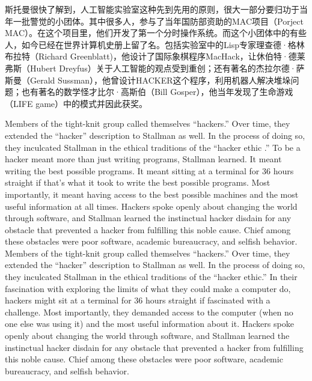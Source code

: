 \ifdefined\chs
斯托曼很快了解到，人工智能实验室这种先到先用的原则，很大一部分要归功于当年一批警觉的小团体。其中很多人，参与了当年国防部资助的MAC项目（Porject MAC）。在这个项目里，他们开发了第一个分时操作系统。而这个小团体中的有些人，如今已经在世界计算机史册上留了名。包括实验室中的Lisp专家理查德·格林布拉特（Richard Greenblatt)，他设计了国际象棋程序MacHack，让休伯特·德莱弗斯（Hubert Dreyfus）关于人工智能的观点受到重创；还有著名的杰拉尔德·萨斯曼（Gerald Sussman），他曾设计HACKER这个程序，利用机器人解决堆垛问题；也有著名的数学怪才比尔·高斯伯（Bill Gosper），他当年发现了生命游戏（LIFE game）中的模式并因此获奖。
\fi

\ifdefined\eng
\ifdefined\vone
Members of the tight-knit group called themselves ``hackers.'' Over time, they extended the ``hacker'' description to Stallman as well. In the process of doing so, they inculcated Stallman in the ethical traditions of the ``hacker ethic .'' To be a hacker meant more than just writing programs, Stallman learned. It meant writing the best possible programs. It meant sitting at a terminal for 36 hours straight if that's what it took to write the best possible programs. Most importantly, it meant having access to the best possible machines and the most useful information at all times. Hackers spoke openly about changing the world through software, and Stallman learned the instinctual hacker disdain for any obstacle that prevented a hacker from fulfilling this noble cause. Chief among these obstacles were poor software, academic bureaucracy, and selfish behavior.
\fi
\ifdefined\vtwo
Members of the tight-knit group called themselves ``hackers.'' Over time, they extended the ``hacker'' description to Stallman as well. In the process of doing so, they inculcated Stallman in the ethical traditions of the ``hacker ethic.'' In their fascination with exploring the limits of what they could make a computer do, hackers might sit at a terminal for 36 hours straight if fascinated with a challenge. Most importantly, they demanded access to the computer (when no one else was using it) and the most useful information about it. Hackers spoke openly about changing the world through software, and Stallman learned the instinctual hacker disdain for any obstacle that prevented a hacker from fulfilling this noble cause. Chief among these obstacles were poor software, academic bureaucracy, and selfish behavior.
\fi
\fi


